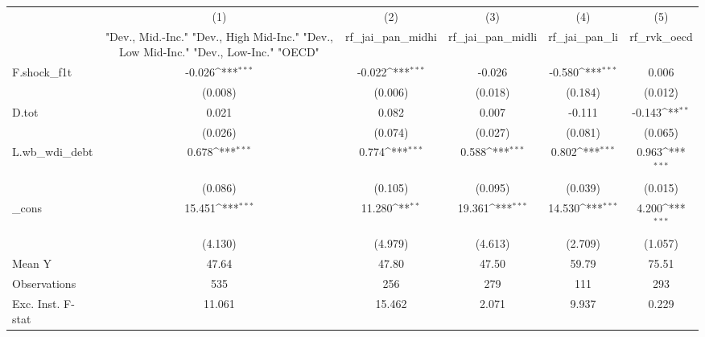 {
\def\sym#1{\ifmmode^{#1}\else\(^{#1}\)\fi}
\begin{tabular}{l*{5}{c}}
\toprule
            &\multicolumn{1}{c}{(1)}&\multicolumn{1}{c}{(2)}&\multicolumn{1}{c}{(3)}&\multicolumn{1}{c}{(4)}&\multicolumn{1}{c}{(5)}\\
            &\multicolumn{1}{c}{ "Dev., Mid.-Inc." "Dev., High Mid-Inc." "Dev., Low Mid-Inc." "Dev., Low-Inc." "OECD" }&\multicolumn{1}{c}{rf\_jai\_pan\_midhi}&\multicolumn{1}{c}{rf\_jai\_pan\_midli}&\multicolumn{1}{c}{rf\_jai\_pan\_li}&\multicolumn{1}{c}{rf\_rvk\_oecd}\\
\midrule
F.shock\_f1t &      -0.026\sym{***}&      -0.022\sym{***}&      -0.026         &      -0.580\sym{***}&       0.006         \\
            &     (0.008)         &     (0.006)         &     (0.018)         &     (0.184)         &     (0.012)         \\
\addlinespace
D.tot       &       0.021         &       0.082         &       0.007         &      -0.111         &      -0.143\sym{**} \\
            &     (0.026)         &     (0.074)         &     (0.027)         &     (0.081)         &     (0.065)         \\
\addlinespace
L.wb\_wdi\_debt&       0.678\sym{***}&       0.774\sym{***}&       0.588\sym{***}&       0.802\sym{***}&       0.963\sym{***}\\
            &     (0.086)         &     (0.105)         &     (0.095)         &     (0.039)         &     (0.015)         \\
\addlinespace
\_cons      &      15.451\sym{***}&      11.280\sym{**} &      19.361\sym{***}&      14.530\sym{***}&       4.200\sym{***}\\
            &     (4.130)         &     (4.979)         &     (4.613)         &     (2.709)         &     (1.057)         \\
\midrule
Mean Y      &       47.64         &       47.80         &       47.50         &       59.79         &       75.51         \\
Observations&         535         &         256         &         279         &         111         &         293         \\
Exc. Inst. F-stat&      11.061         &      15.462         &       2.071         &       9.937         &       0.229         \\
\bottomrule
\end{tabular}
}
